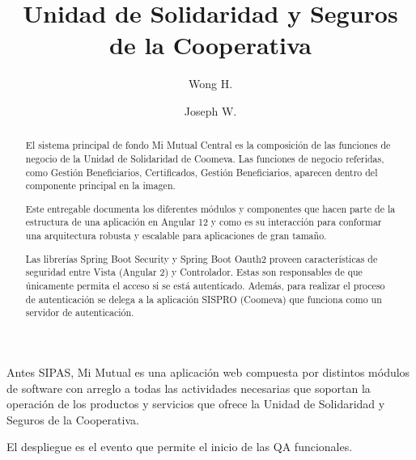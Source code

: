 \documentclass[
  journal=large,
  manuscript=propuesta,
  year=2020,
  volume=37,
]{cup-journal}
\title{Unidad de Solidaridad y Seguros de la Cooperativa}
\author{Wong H.}
\affiliation{Ing., Organization, City, Pincode, State, Country}
\author{Joseph W.}
\affiliation{Arq., Organization, City, Pincode, State, Country}
\author{}
\affiliation{}
\author{}
\affiliation{}
\begin{document}
\begin{abstract}
El sistema principal de fondo Mi Mutual Central es la composición de las
funciones de negocio de la Unidad de Solidaridad de Coomeva. Las
funciones de negocio referidas, como Gestión Beneficiarios,
Certificados, Gestión Beneficiarios, aparecen dentro del componente
principal en la imagen.

Este entregable documenta los diferentes módulos y componentes que hacen
parte de la estructura de una aplicación en Angular 12 y como es su
interacción para conformar una arquitectura robusta y escalable para
aplicaciones de gran tamaño.

Las librerías Spring Boot Security y Spring Boot Oauth2 proveen
características de seguridad entre Vista (Angular 2) y Controlador.
Estas son responsables de que únicamente permita el acceso si se está
autenticado. Además, para realizar el proceso de autenticación se delega
a la aplicación SISPRO (Coomeva) que funciona como un servidor de
autenticación.
\end{abstract}

\noindent Antes SIPAS, Mi Mutual es una aplicación web compuesta por
distintos módulos de software con arreglo a todas las actividades
necesarias que soportan la operación de los productos y servicios que
ofrece la Unidad de Solidaridad y Seguros de la Cooperativa.

El despliegue es el evento que permite el inicio de las QA funcionales.
\end{document}
